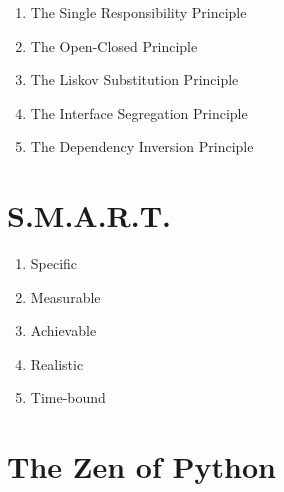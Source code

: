\documentclass [8pt] {extarticle}
\begin{document}
    \begin {enumerate}
        \item The Single Responsibility Principle
        \item The Open-Closed Principle
        \item The Liskov Substitution Principle
        \item The Interface Segregation Principle
        \item The Dependency Inversion Principle
    \end {enumerate}

    \section {S.M.A.R.T.}

    \begin {enumerate}
        \item Specific
        \item Measurable
        \item Achievable
        \item Realistic
        \item Time-bound
    \end {enumerate}

    \section {The Zen of Python}
\end{document}

